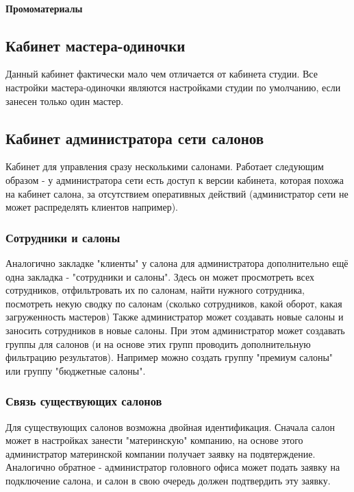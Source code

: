 \documentclass[DIV=calc, paper=a4, fontsize=11pt]{scrartcl} %
\begin{document}
\paragraph{Промоматериалы}


\subsection{Кабинет мастера-одиночки}
Данный кабинет фактически мало чем отличается от кабинета студии. Все настройки мастера-одиночки являются настройками студии по умолчанию, если занесен только один мастер.

\subsection{Кабинет администратора сети салонов} \label{subsec:saloon_network}
Кабинет для управления сразу несколькими салонами. Работает следующим образом - у администратора сети есть доступ к версии кабинета, которая похожа на кабинет салона, за отсутствием оперативных действий (администратор сети не может распределять клиентов например). 

\subsubsection{Сотрудники и салоны}
Аналогично закладке "клиенты" у салона для администратора дополнительно ещё одна закладка - "сотрудники и салоны". Здесь он может просмотреть всех сотрудников, отфильтровать их по салонам, найти нужного сотрудника, посмотреть некую сводку по салонам (сколько сотрудников, какой оборот, какая загруженность мастеров) 
Также администратор может создавать новые салоны и заносить сотрудников в новые салоны. При этом администратор может создавать группы для салонов (и на основе этих групп проводить дополнительную фильтрацию результатов). Например можно создать группу "премиум салоны" или группу "бюджетные салоны".

\subsubsection{Связь существующих салонов}
Для существующих салонов возможна двойная идентификация. Сначала салон может в настройках занести "материнскую" компанию, на основе этого администратор материнской компании получает заявку на подвтерждение. Аналогично обратное - администратор головного офиса может подать заявку на подключение салона, и салон в свою очередь должен подтвердить эту заявку.
\end{document}
